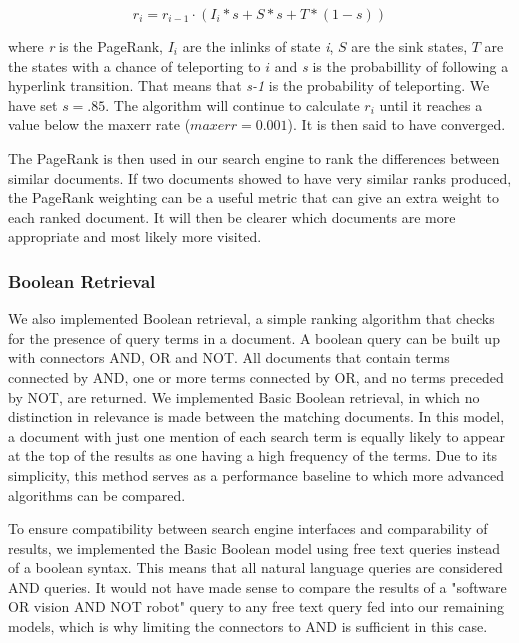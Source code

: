 $$ r_i = r_{i-1} \cdot (I_i *s + S * s + T * (1-s)) $$ 

where \emph{r} is the PageRank, \emph{$I_i$} are the inlinks of state \emph{i}, \emph{$S$} are the sink states, \emph{$T$} are the states with a chance of teleporting to $i$ and \emph{s} is the probabillity of following a hyperlink transition. That means that \emph{s-1} is the probability of teleporting. We have set $s=.85$. The algorithm will continue to calculate \emph{$r_i$} until it reaches a value below the maxerr rate ($maxerr = 0.001$). It is then said to have converged. 

The PageRank is then used in our search engine to rank the differences between similar documents. If two documents showed to have very similar ranks produced, the PageRank weighting can be a useful metric that can give an extra weight to each ranked document. It will then be clearer which documents are more appropriate and most likely more visited. 



\subsubsection{Boolean Retrieval} %
\label{ssub:boolean_retrieval}

We also implemented Boolean retrieval, a simple ranking algorithm that checks for the presence of query terms in a document. A boolean query can be built up with connectors AND, OR and NOT. All documents that contain terms connected by AND, one or more terms connected by OR, and no terms preceded by NOT, are returned. We implemented Basic Boolean retrieval, in which no distinction in relevance is made between the matching documents. In this model, a document with just one mention of each search term is equally likely to appear at the top of the results as one having a high frequency of the terms. Due to its simplicity, this method serves as a performance baseline to which more advanced algorithms can be compared.

To ensure compatibility between search engine interfaces and comparability of results, we implemented the Basic Boolean model using free text queries instead of a boolean syntax. This means that all natural language queries are considered AND queries. It would not have made sense to compare the results of a "software OR vision AND NOT robot" query to any free text query fed into our remaining models, which is why limiting the connectors to AND is sufficient in this case.

